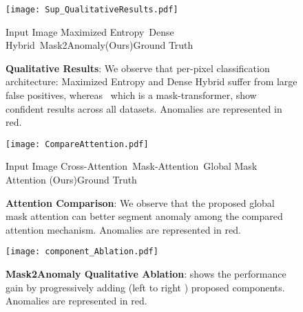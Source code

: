 \documentclass[10pt,twocolumn,letterpaper]{article}
\newcommand\our{\text{Mask2Anomaly}}
\begin{document}
\begin{figure*}[t]
    \begin{center}
        \texttt{[image: Sup\_QualitativeResults.pdf]}
    \end{center}
    \vspace{-1.25em}
    {{\hspace{3em}Input Image \hspace{2.15em}Maximized Entropy~\cite{chan2021entropy}\hspace{1.25em}Dense Hybrid~\cite{grcic2022densehybrid}\hspace{1.75em}Mask2Anomaly(Ours)\hspace{2.5em}Ground Truth}}
\caption{\textbf{Qualitative Results}: We observe that per-pixel classification architecture: Maximized Entropy and Dense Hybrid suffer from large false positives, whereas~\our{} which is a mask-transformer, show confident results across all datasets. Anomalies are represented in red.}
\label{fig:sup:f1} \vspace{-1em}
\end{figure*}
\begin{figure*}[t]
    \begin{center}
        \texttt{[image: CompareAttention.pdf]}
    \end{center}
    \vspace{-1.25em}
    {\small{\hspace{3.25em}Input Image \hspace{4.25em}Cross-Attention~\cite{cheng2021per}\hspace{3.25em}Mask-Attention~\cite{cheng2022masked}\hspace{1.25em}Global Mask Attention (Ours)\hspace{2.75em}Ground Truth}}
\caption{\textbf{Attention Comparison}: We observe that the proposed global mask attention can better segment anomaly among the compared attention mechanism. Anomalies are represented in red.}
\label{fig:sup:f2} \vspace{-1em}
\end{figure*}
\begin{figure*}[t]
    \begin{center}
        \texttt{[image: component\_Ablation.pdf]}
    \end{center}
    \vspace{-1.25em}
\caption{\textbf{ Mask2Anomaly Qualitative Ablation}: shows the performance gain by progressively adding (left to right ) proposed components. Anomalies are represented in red.}
\label{fig:sup:f3} \vspace{-1em}
\end{figure*}
\end{document}
